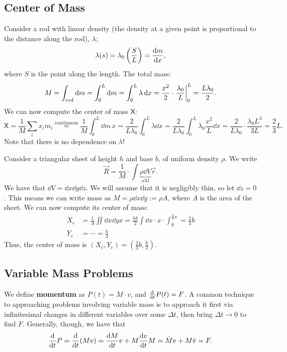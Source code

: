 \documentclass[12pt]{article}
\begin{document}
\subsection{Center of Mass}

\begin{example}
  Consider a rod with linear density (the density at a given point is proportional to the distance along the rod), $\lambda$;
  \[\lambda(s) = \lambda_0 \left(\frac{S}{L}\right) = \dv{m}{x},\] where $S$ is the point along the length. The total mass:
  \[M = \int_\text{rod} \dd{m} = \int_0^L \dd{m} = \int_0^L \lambda \dd{x} = \frac{x^2}{2}\cdot\eval{\frac{\lambda_0}{L}}_0^L = \frac{L \lambda_0}{2}.\]
  We can now compute the center of mass $\mathsf{X}$:
  \[\mathsf{X} = \frac{1}{M}\sum_i x_i m_i \overset{\text{continuous}}{=} \frac{1}{M}\int_0^L \dd m \,x = \frac{2}{L\lambda_0} \int_0^L \lambda \dd{x} = \frac{2}{L\lambda_0} \int_0^L \lambda_0 \frac{x^2}{L} \dd{x} = \frac{2}{L \lambda_0} \cdot \frac{\lambda_0 L^3}{3L} = \frac{2}{3}L.\] Note that there is no dependence on $\lambda$!
\end{example}

\begin{example}
  Consider a triangular sheet of height $h$ and base $b$, of uniform density $\rho$. We write \[\vec{R} = \frac{1}{M} \cdot \int \underbrace{\rho \dd{V}}_{\dd{M}} \vec{r}.\]
  We have that $\dd{V} = \dd x \dd y \dd z$. We will assume that it is negligibly thin, so let $\dd z = 0$. This means we can write mass as $M = \rho \dd{x}\dd{y} := \rho A$, where $A$ is the area of the sheet. We can now compute its center of mass:
  \begin{align*}
    X_c &= \frac{1}{A}\iint \dd x \dd y x = \frac{hb}{2}\int \dd x \cdot x \cdot \int_0^{\frac{h}{b}x} = \frac{2}{3}b\\
    Y_c &= \cdots = \frac{h}{3}
  \end{align*}
  Thus, the center of mass is $(X_c,Y_c)=(\frac{2}{3}b,\frac{h}{3})$.
\end{example}

\subsection{Variable Mass Problems}

We define \textbf{momentum} as $P(t) = M\cdot v$, and $\dv{t} P(t) = F$. A common technique to approaching problems involving variable mass is to approach it first via infinitesimal changes in different variables over some $\Delta t$, then bring $\Delta t \to 0$ to find $F$. Generally, though, we have that \[\dv{t}P = \dv{t}(Mv) = \dv{M}{t} v + M \dv{v}{t}M = \dot{M}v +M \dot{v} = F.\]
\end{document}
